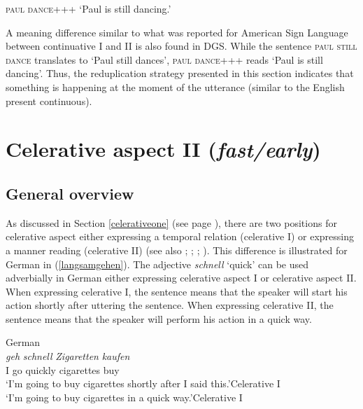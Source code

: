 \begin{exe}
\ex \textsc{paul dance+++} 
\glt `Paul is still dancing.' \label{continuativetwodgs}
\end{exe}

\noindent A meaning difference similar to what was reported for American Sign Language between continuative I and II is also found in DGS. While the sentence \textsc{paul still dance} translates to `Paul still dances', \textsc{paul dance+++} reads `Paul is still dancing'. Thus, the reduplication strategy presented in this section indicates that something is happening at the moment of the utterance (similar to the English present continuous).


\section{Celerative aspect II (\textit{fast/early})}\label{celerativetwo}
\subsection{General overview}
As discussed in Section \ref{celerativeone} (see page \pageref{celerativeone}), there are two positions for celerative aspect either expressing a temporal relation (celerative I) or expressing a manner reading (celerative II) (see also \citealt{travis1988syntax}; \citealt[103--104]{cinque1999adverbs}; \citealt{tennyl2000core}; \citealt{ernst2002syntax}). This difference is illustrated for German in (\ref{langsamgehen}). The adjective \textit{schnell} `quick' can be used adverbially in German either expressing celerative aspect I or celerative aspect II. When expressing celerative I, the sentence means that the speaker will start his action shortly after uttering the sentence. When expressing celerative II, the sentence means that the speaker will perform his action in a quick way.



\begin{exe}
\ex German \\  {\textit{geh}} {\textit{schnell}} {\textit{Zigaretten}} {\textit{kaufen}}  \\
{I} {go} {quickly} {cigarettes} {buy}\\
\trans `I'm going to buy cigarettes shortly after I said this.'\hfill{Celerative I}\\
`I'm going to buy cigarettes in a quick way.'\hfill{Celerative I}
\label{langsamgehen}
\end{exe}


